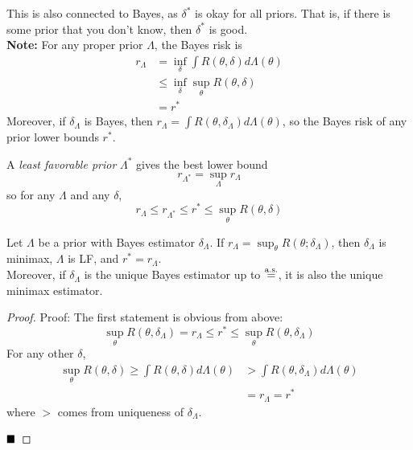 This is also connected to Bayes, as $\delta^{*}$ is okay for all priors. That is, if there is some prior that you don't know, then $\delta^{*}$ is good.\\

\textbf{Note:} For any proper prior $\Lambda$, the Bayes risk is
\begin{align*}
    r_{\Lambda} &= \inf_{\delta}\int R(\theta, \delta) d\Lambda(\theta)\\
    &\leq \inf_{\delta}\sup_{\theta} R(\theta, \delta)\\
    &= r^{*}
\end{align*}
Moreover, if $\delta_{\Lambda}$ is Bayes, then $r_{\Lambda} = \int R(\theta, \delta_{\Lambda}) d\Lambda(\theta)$, so the Bayes risk of any prior lower bounds $r^{*}$.

\begin{definition}
    A \emph{least favorable prior} $\Lambda^{*}$ gives the best lower bound
    \[ r_{\Lambda^{*}} = \sup_{\Lambda} r_{\Lambda} \]
    so for any $\Lambda$ and any $\delta$,
    \[ r_{\Lambda} \leq r_{\Lambda^{*}} \leq r^{*} \leq \sup_{\theta} R(\theta, \delta) \]
\end{definition}

\begin{theorem}
    Let $\Lambda$ be a prior with Bayes estimator $\delta_{\Lambda}$. If $r_{\Lambda} = \sup_{\theta} R(\theta; \delta_{\Lambda})$, then $\delta_{\Lambda}$ is minimax, $\Lambda$ is LF, and $r^{*} = r_{\Lambda}$.\\

    Moreover, if $\delta_{\Lambda}$ is the unique Bayes estimator up to $\overset{\tt{a.s.}}{=}$, it is also the unique minimax estimator.
\end{theorem}
\begin{proof}{Proof:}
    The first statement is obvious from above:
    \[ \sup_{\theta} R(\theta, \delta_{\Lambda}) = r_{\Lambda} \leq r^{*} \leq \sup_{\theta} R(\theta, \delta_{\Lambda}) \]
    For any other $\delta$,
    \begin{align*}
        \sup_{\theta} R(\theta, \delta) \geq \int R(\theta, \delta) d\Lambda(\theta) &> \int R(\theta, \delta_{\Lambda}) d\Lambda(\theta)\\
        &= r_{\Lambda} = r^{*}
    \end{align*}
    where $>$ comes from uniqueness of $\delta_{\Lambda}$.

    $\qed$
\end{proof}

